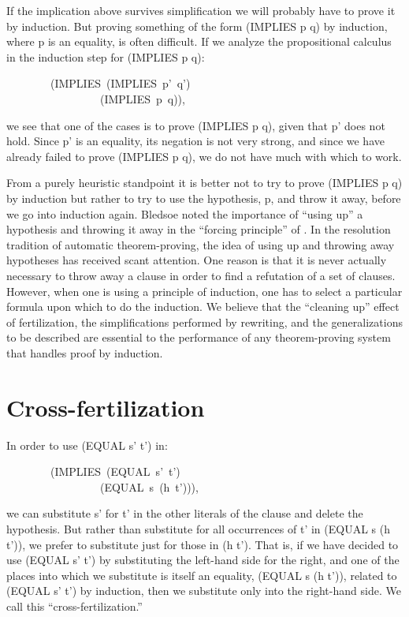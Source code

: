 \documentclass[11pt]{book}
\newenvironment{pubasis}{\begin{flushleft}\ttfamily\small}{\normalsize\rmfamily\end{flushleft}}
\newcommand{\pubdefaulttextsize}{\large}
\begin{document}
If the implication above survives simplification we will probably have
to prove it by induction.  But proving something of the
form (IMPLIES p q) by induction, where p is an equality, is often difficult.  If we
analyze the propositional calculus in the  induction step for (IMPLIES p q):
\begin{pubasis}
~~~~~~~~(IMPLIES~(IMPLIES~p'~q')\\
~~~~~~~~~~~~~~~~~(IMPLIES~p~q)),\\
\end{pubasis}
we see that one of the cases is to prove (IMPLIES p q), given that p' does not
hold.  Since p' is an equality, its negation is not very strong, and since
we have already failed to prove (IMPLIES p q), we do not have much with which to work.

From a purely heuristic standpoint it is better not to try to prove
(IMPLIES p q) by induction but rather to try to use the
hypothesis, p, and throw it away, before we go into induction again.
Bledsoe noted the importance of ``using up'' a hypothesis 
and throwing it away in the ``forcing principle'' of \cite{BLEDSOELIMIT}.
In the resolution tradition of automatic theorem-proving,
the idea of using up and throwing away hypotheses has received scant
attention.  One reason is that it is never actually
necessary to throw away a clause in order to find a refutation of
a set of clauses.  However, when one is using a principle of induction,
one has to select a particular formula
upon which to do the induction.  We believe
that the ``cleaning up'' effect of fertilization, the simplifications
performed by rewriting, and the generalizations to be described
are essential to the performance of any theorem-proving system that
handles proof by induction.
\section{Cross-fertilization}
\pubdefaulttextsize
In order to use (EQUAL s' t') in:
\begin{pubasis}
~~~~~~~~(IMPLIES~(EQUAL~s'~t')\\
~~~~~~~~~~~~~~~~~(EQUAL~s~(h~t'))),\\
\end{pubasis}
we can substitute s' for t' in the other literals of the clause and
delete the hypothesis.  But rather than substitute for all occurrences
of t' in (EQUAL s (h t')), we prefer to substitute just for those in (h t').
That is, if we have decided to use (EQUAL s' t') by  substituting the left-hand side
for the right, and one of the places into which we substitute is itself an
equality, (EQUAL s (h t')), related to (EQUAL s' t') by induction, then we substitute
only into the right-hand side.  We call this ``cross-fertilization.''
\end{document}
